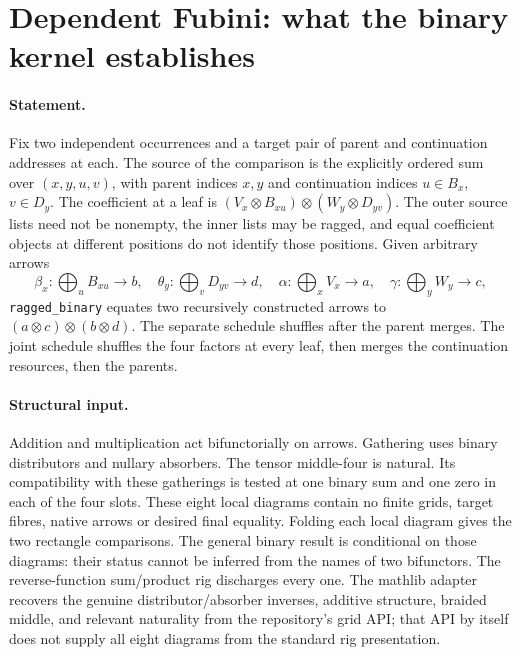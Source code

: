\documentclass{article}
\begin{document}
\section*{Dependent Fubini: what the binary kernel establishes}
\paragraph{Statement.}
Fix two independent occurrences and a target pair of parent and continuation
addresses at each. The source of the comparison is the explicitly ordered
sum over $(x,y,u,v)$, with parent indices $x,y$ and continuation indices
$u\in B_x$, $v\in D_y$. The coefficient at a leaf is
$(V_x\otimes B_{xu})\otimes(W_y\otimes D_{yv})$.
The outer source lists need not be nonempty, the inner lists may be ragged,
and equal coefficient objects at different positions do not identify those
positions. Given arbitrary arrows
\[
 \beta_x:\bigoplus_u B_{xu}\longrightarrow b,\quad
 \theta_y:\bigoplus_v D_{yv}\longrightarrow d,\quad
 \alpha:\bigoplus_x V_x\longrightarrow a,\quad
 \gamma:\bigoplus_y W_y\longrightarrow c ,
\]
\texttt{ragged\_binary} equates two recursively constructed arrows to
$(a\otimes c)\otimes(b\otimes d)$. The separate schedule shuffles after
the parent merges. The joint schedule shuffles the four factors at every
leaf, then merges the continuation resources, then the parents.
\paragraph{Structural input.}
Addition and multiplication act bifunctorially on arrows. Gathering uses
binary distributors and nullary absorbers. The tensor middle-four is
natural. Its compatibility with these gatherings is tested at one binary
sum and one zero in each of the four slots. These eight local diagrams
contain no finite grids, target fibres, native arrows or desired final
equality. Folding each local diagram gives the two rectangle comparisons.
The general binary result is conditional on those diagrams: their status
cannot be inferred from the names of two bifunctors. The reverse-function
sum/product rig discharges every one. The mathlib adapter recovers the genuine
distributor/absorber inverses, additive structure, braided middle, and relevant
naturality from the repository's grid API; that API by itself does not
supply all eight diagrams from the standard rig presentation.
\end{document}
